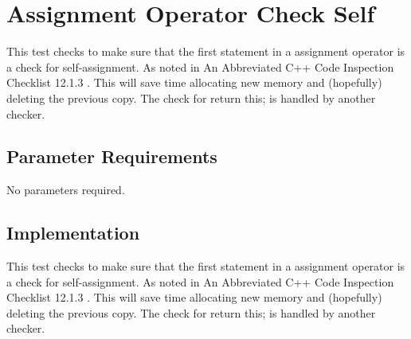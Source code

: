%
%

\section{Assignment Operator Check Self}
\label{AssignmentOperatorCheckSelf::overview}
This test checks to make sure that the first statement in a assignment
operator is a check for self-assignment.  
As noted in An Abbreviated C++ Code Inspection Checklist 12.1.3 .
This will save time allocating new memory and (hopefully) deleting the
 previous copy.  The check for return this; is handled by another checker. 

\subsection{Parameter Requirements}

No parameters required.

\subsection{Implementation}
  This test checks to make sure that the first statement in a
  assignment operator is a check for self-assignment.  As noted in
 An Abbreviated C++ Code Inspection Checklist 12.1.3 .  This will
 save time allocating new memory and (hopefully) deleting the previous
 copy.  The check for return this; is handled by another checker.
  
